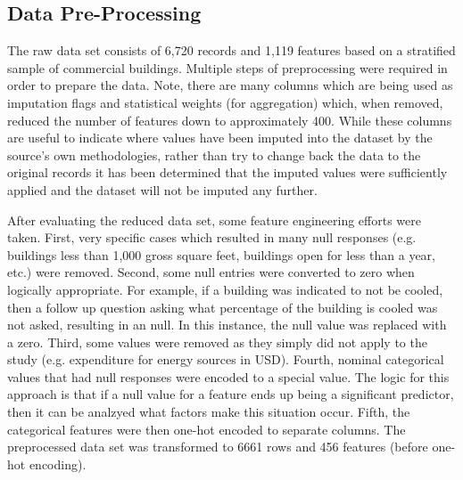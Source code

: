 \subsection{Data Pre-Processing}

The raw data set consists of 6,720 records and 1,119 features based on a stratified sample of commercial buildings.  Multiple steps of preprocessing were required in order to prepare the data.  Note, there are many columns which are being used as imputation flags and statistical weights (for aggregation) which, when removed, reduced the number of features down to approximately 400.  While these columns are useful to indicate where values have been imputed into the dataset by the source's own methodologies, rather than try to change back the data to the original records it has been determined that the imputed values were sufficiently applied and the dataset will not be imputed any further.

After evaluating the reduced data set, some feature engineering efforts were taken.  First, very specific cases which resulted in many null responses (e.g. buildings less than 1,000 gross square feet, buildings open for less than a year, etc.) were removed.  Second, some null entries were converted to zero when logically appropriate.  For example, if a building was indicated to not be cooled, then a follow up question asking what percentage of the building is cooled was not asked, resulting in an null.  In this instance, the null value was replaced with a zero.  Third, some values were removed as they simply did not apply to the study (e.g. expenditure for energy sources in USD).  Fourth, nominal categorical values that had null responses were encoded to a special value.  The logic for this approach is that if a null value for a feature ends up being a significant predictor, then it can be analzyed what factors make this situation occur.  Fifth, the categorical features were then one-hot encoded to separate columns.  The preprocessed data set was transformed to 6661 rows and 456 features (before one-hot encoding).